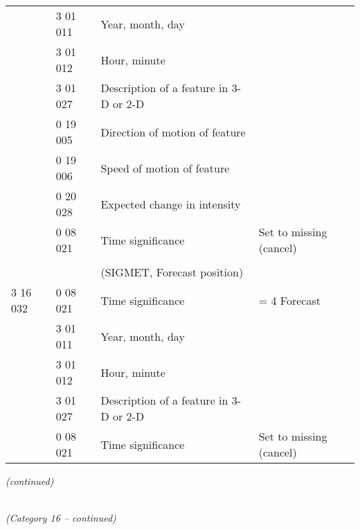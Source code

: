 \begin{longtable}[]{@{}llll@{}}
& 3 01 011 & Year, month, day &\tabularnewline
& 3 01 012 & Hour, minute &\tabularnewline
& 3 01 027 & Description of a feature in 3-D or 2-D &\tabularnewline
& 0 19 005 & Direction of motion of feature &\tabularnewline
& 0 19 006 & Speed of motion of feature &\tabularnewline
& 0 20 028 & Expected change in intensity &\tabularnewline
& 0 08 021 & Time significance & Set to missing (cancel)\tabularnewline
& & &\tabularnewline
& & (SIGMET, Forecast position) &\tabularnewline
3 16 032 & 0 08 021 & Time significance & = 4 Forecast\tabularnewline
& 3 01 011 & Year, month, day &\tabularnewline
& 3 01 012 & Hour, minute &\tabularnewline
& 3 01 027 & Description of a feature in 3-D or 2-D &\tabularnewline
& 0 08 021 & Time significance & Set to missing (cancel)\tabularnewline
\bottomrule
\end{longtable}

\emph{(continued)}

\emph{\\
(Category 16 -- continued)}

